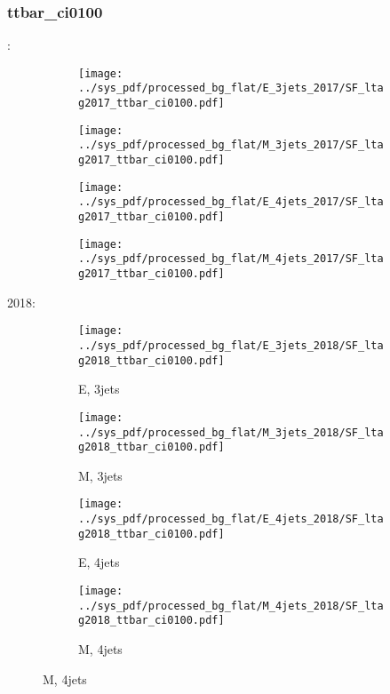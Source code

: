 \documentclass{beamer}
\begin{document}
\begin{frame}
\frametitle{ttbar_ci0100}
\fontsize{5}{1}:
\begin{figure}
\centering
\begin{subfigure}[b]{0.24\textwidth}
\texttt{[image: ../sys\_pdf/processed\_bg\_flat/E\_3jets\_2017/SF\_ltag2017\_ttbar\_ci0100.pdf]}
\end{subfigure}
\begin{subfigure}[b]{0.24\textwidth}
\texttt{[image: ../sys\_pdf/processed\_bg\_flat/M\_3jets\_2017/SF\_ltag2017\_ttbar\_ci0100.pdf]}
\end{subfigure}
\begin{subfigure}[b]{0.24\textwidth}
\texttt{[image: ../sys\_pdf/processed\_bg\_flat/E\_4jets\_2017/SF\_ltag2017\_ttbar\_ci0100.pdf]}
\end{subfigure}
\begin{subfigure}[b]{0.24\textwidth}
\texttt{[image: ../sys\_pdf/processed\_bg\_flat/M\_4jets\_2017/SF\_ltag2017\_ttbar\_ci0100.pdf]}
\end{subfigure}
\end{figure}
2018:
\begin{figure}
\centering
\begin{subfigure}[b]{0.24\textwidth}
\texttt{[image: ../sys\_pdf/processed\_bg\_flat/E\_3jets\_2018/SF\_ltag2018\_ttbar\_ci0100.pdf]}
\captionsetup{font=tiny}
\caption{E, 3jets}
\end{subfigure}
\begin{subfigure}[b]{0.24\textwidth}
\texttt{[image: ../sys\_pdf/processed\_bg\_flat/M\_3jets\_2018/SF\_ltag2018\_ttbar\_ci0100.pdf]}
\captionsetup{font=tiny}
\caption{M, 3jets}
\end{subfigure}
\begin{subfigure}[b]{0.24\textwidth}
\texttt{[image: ../sys\_pdf/processed\_bg\_flat/E\_4jets\_2018/SF\_ltag2018\_ttbar\_ci0100.pdf]}
\captionsetup{font=tiny}
\caption{E, 4jets}
\end{subfigure}
\begin{subfigure}[b]{0.24\textwidth}
\texttt{[image: ../sys\_pdf/processed\_bg\_flat/M\_4jets\_2018/SF\_ltag2018\_ttbar\_ci0100.pdf]}
\captionsetup{font=tiny}
\caption{M, 4jets}
\end{subfigure}
\end{figure}
\end{frame}
\end{document}

